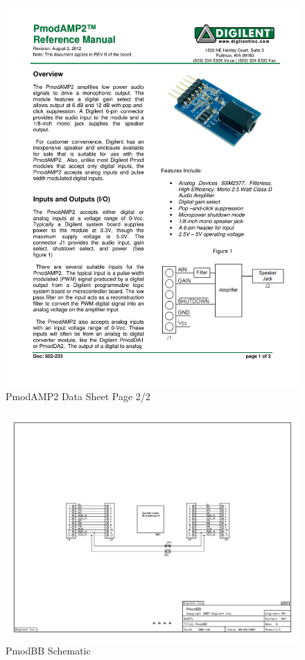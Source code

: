 \documentclass{article}
\begin{document}
		\begin{figure}[H]
		  	\centering
		  	\includegraphics[width=6.5in, page=2]{additionalDataSheets/PmodAMP2}
		  	\caption{PmodAMP2 Data Sheet Page 2/2}
		\end{figure}

		\begin{figure}[c]
		  	\centering
		  	\includegraphics[width=6.5in]{additionalDataSheets/PmodBB}
		  	\caption{PmodBB Schematic}
		\end{figure}

\end{document}
